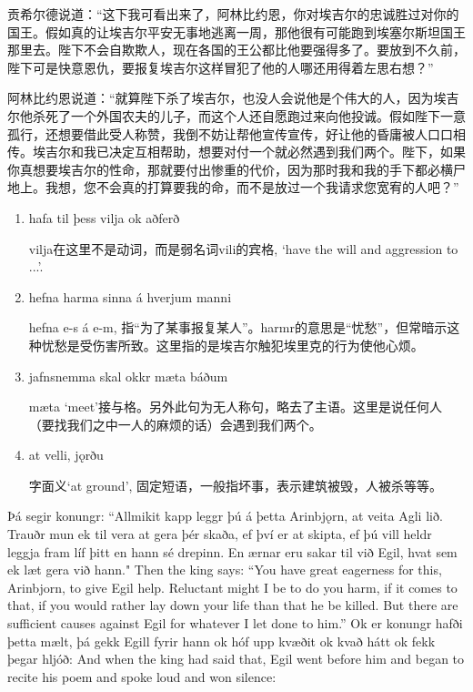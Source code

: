 \begin{translation*}{}
    贡希尔德说道：“这下我可看出来了，阿林比约恩，你对埃吉尔的忠诚胜过对你的国王。假如真的让埃吉尔平安无事地逃离一周，那他很有可能跑到埃塞尔斯坦国王那里去。陛下不会自欺欺人，现在各国的王公都比他要强得多了。要放到不久前，陛下可是快意恩仇，要报复埃吉尔这样冒犯了他的人哪还用得着左思右想？”

    阿林比约恩说道：“就算陛下杀了埃吉尔，也没人会说他是个伟大的人，因为埃吉尔他杀死了一个外国农夫的儿子，而这个人还自愿跑过来向他投诚。假如陛下一意孤行，还想要借此受人称赞，我倒不妨让帮他宣传宣传，好让他的昏庸被人口口相传。埃吉尔和我已决定互相帮助，想要对付一个就必然遇到我们两个。陛下，如果你真想要埃吉尔的性命，那就要付出惨重的代价，因为那时我和我的手下都必横尸地上。我想，您不会真的打算要我的命，而不是放过一个我请求您宽宥的人吧？”
\end{translation*}
\begin{grammar*}{}
    \begin{enumerate}[leftmargin=*]
        \item hafa til þess vilja ok aðferð

              vilja在这里不是动词，而是弱名词vili的宾格, `have the will and aggression to ...'.

        \item hefna harma sinna á hverjum manni

              hefna e-s á e-m, 指“为了某事报复某人”。harmr的意思是“忧愁”，但常暗示这种忧愁是受伤害所致。这里指的是埃吉尔触犯埃里克的行为使他心烦。

        \item jafnsnemma skal okkr mæta báðum

              mæta `meet'接与格。另外此句为无人称句，略去了主语。这里是说任何人（要找我们之中一人的麻烦的话）会遇到我们两个。

        \item at velli, jǫrðu

              字面义`at ground', 固定短语，一般指坏事，表示建筑被毁，人被杀等等。
    \end{enumerate}
\end{grammar*}
\begin{paracol}{2}
    Þá segir konungr: ``Allmikit kapp leggr þú á þetta Arinbjǫrn, at veita Agli lið. Trauðr mun ek til vera at gera þér skaða, ef því er at skipta, ef þú vill heldr leggja fram líf þitt en hann sé drepinn. En ærnar eru sakar til við Egil, hvat sem ek læt gera við hann."
    \switchcolumn
    Then the king says: ``You have great eagerness for this, Arinbjorn, to give Egil help. Reluctant might I be to do you harm, if it comes to that, if you would rather lay down your life than that he be killed. But there are sufficient causes against Egil for whatever I let done to him.''
    \switchcolumn*
    Ok er konungr hafði þetta mælt, þá gekk Egill fyrir hann ok hóf upp kvæðit ok kvað hátt ok fekk þegar hljóð:
    \switchcolumn
    And when the king had said that, Egil went before him and began to recite his poem and spoke loud and won silence:
\end{paracol}


